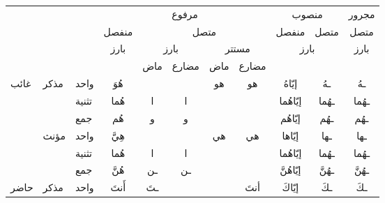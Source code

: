 \documentclass[../main.tex]{subfiles}
\begin{document}
\begin{table}[H]
\centering
\begin{tabular}{lll|ccccc|cc|c|}
\cline{4-11}
 &  &  & \multicolumn{5}{c|}{مرفوع} & \multicolumn{2}{c|}{منصوب} & مجرور \\ \cline{4-11} 
 &  &  & \multicolumn{1}{c|}{منفصل} & \multicolumn{4}{c|}{متصل} & \multicolumn{1}{c|}{منفصل} & متصل & متصل \\ \cline{4-11} 
 &  &  & \multicolumn{1}{c|}{بارز} & \multicolumn{2}{c|}{بارز} & \multicolumn{2}{c|}{مستتر} & \multicolumn{2}{c|}{بارز} & بارز \\ \cline{4-11} 
 &  &  & \multicolumn{1}{c|}{} & \multicolumn{1}{c|}{ماض} & \multicolumn{1}{c|}{مضارع} & \multicolumn{1}{c|}{ماض} & مضارع &  &  &  \\ \hline
\multicolumn{1}{|l|}{\multirow{6}{*}{غائب}} & \multicolumn{1}{l|}{\multirow{3}{*}{مذكر}} & واحد & \multicolumn{1}{c|}{هُوَ} & \multicolumn{1}{c|}{} & \multicolumn{1}{c|}{} & \multicolumn{1}{c|}{هو} & هو & \multicolumn{1}{c|}{إيّاهُ} & ـهُ & ـهُ \\ \cline{3-11} 
\multicolumn{1}{|l|}{} & \multicolumn{1}{l|}{} & تثنية & \multicolumn{1}{c|}{هُما} & \multicolumn{1}{c|}{ا} & \multicolumn{1}{c|}{ا} & \multicolumn{1}{c|}{} &  & \multicolumn{1}{c|}{إيّاهُما} & ـهُما & ـهُما \\ \cline{3-11} 
\multicolumn{1}{|l|}{} & \multicolumn{1}{l|}{} & جمع & \multicolumn{1}{c|}{هُم} & \multicolumn{1}{c|}{و} & \multicolumn{1}{c|}{و} & \multicolumn{1}{c|}{} &  & \multicolumn{1}{c|}{إيّاهُم} & ـهُم & ـهُم \\ \cline{2-11} 
\multicolumn{1}{|l|}{} & \multicolumn{1}{l|}{\multirow{3}{*}{مؤنث}} & واحد & \multicolumn{1}{c|}{هِيَّ} & \multicolumn{1}{c|}{} & \multicolumn{1}{c|}{} & \multicolumn{1}{c|}{هي} & هي & \multicolumn{1}{c|}{إيّاها} & ـها & ـها \\ \cline{3-11} 
\multicolumn{1}{|l|}{} & \multicolumn{1}{l|}{} & تثنية & \multicolumn{1}{c|}{هُما} & \multicolumn{1}{c|}{ا} & \multicolumn{1}{c|}{ا} & \multicolumn{1}{c|}{} &  & \multicolumn{1}{c|}{إيّاهُما} & ـهُما & ـهُما \\ \cline{3-11} 
\multicolumn{1}{|l|}{} & \multicolumn{1}{l|}{} & جمع & \multicolumn{1}{c|}{هُنَّ} & \multicolumn{1}{c|}{ـن} & \multicolumn{1}{c|}{ـن} & \multicolumn{1}{c|}{} &  & \multicolumn{1}{c|}{إيّاهُنَّ} & ـهُنَّ & ـهُنَّ \\ \hline
\multicolumn{1}{|l|}{\multirow{6}{*}{حاضر}} & \multicolumn{1}{l|}{\multirow{3}{*}{مذكر}} & واحد & \multicolumn{1}{c|}{أَنتَ} & \multicolumn{1}{c|}{ـتَ} & \multicolumn{1}{c|}{} & \multicolumn{1}{c|}{} & أنتَ & \multicolumn{1}{c|}{إيّاكَ} & ـكَ & ـكَ \\ \cline{3-11} 

\end{tabular}
\end{table}
\end{document}
